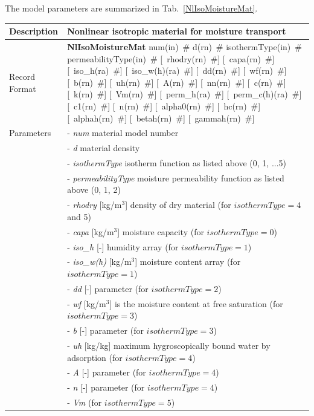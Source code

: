 \documentclass[a4paper]{article}
\newcommand{\descitem}[1]{{\noindent \bf #1}}
\newcommand{\elemparam}[2]{{{#1\tiny (#2)}~\#}}
\newcommand{\optelemparam}[2]{[{~\elemparam{#1}{#2}}]}
\newcommand{\param}[1]{{\it #1}}
\newenvironment{mmt}{\begin{tabular}{|l|p{9cm}|}}{\end{tabular}\\}
\newenvironment{mmt}{\begin{tabular}{|l|l|}}{\end{tabular}\\}
\begin{document}
The model parameters are summarized in Tab.~\ref{NlIsoMoistureMat}.
\begin{table}[!htb]
\begin{mmt}
\hline
Description & Nonlinear isotropic material for moisture transport \\
\hline
Record Format & \descitem{NlIsoMoistureMat} \elemparam{num}{in}
\elemparam{d}{rn} \elemparam{isothermType}{in} \elemparam{permeabilityType}{in}
\optelemparam{rhodry}{rn} \optelemparam{capa}{rn}
\optelemparam{iso\_h}{ra} \optelemparam{iso\_w(h)}{ra}
\optelemparam{dd}{rn} \optelemparam{wf}{rn} \optelemparam{b}{rn}
\optelemparam{uh}{rn} \optelemparam{A}{rn} \optelemparam{nn}{rn}
\optelemparam{c}{rn} \optelemparam{k}{rn} \optelemparam{Vm}{rn}
\optelemparam{perm\_h}{ra} \optelemparam{perm\_c(h)}{ra}
\optelemparam{c1}{rn} \optelemparam{n}{rn} \optelemparam{alpha0}{rn}
\optelemparam{hc}{rn} \optelemparam{alphah}{rn}
\optelemparam{betah}{rn} \optelemparam{gammah}{rn} \\
Parameters &- \param{num} material model number \\
&- \param{d} material density \\
&- \param{isothermType} isotherm function as listed above (0, 1, ...5)
\\
&- \param{permeabilityType} moisture permeability function as listed
above (0, 1, 2) \\
&- \param{rhodry} [kg/m$^3$] density of dry material (for $isothermType=4$ and 5) \\
&- \param{capa} [kg/m$^3$] moisture capacity (for $isothermType=0$) \\
&- \param{iso\_h} [-] humidity array (for $isothermType=1$) \\
&- \param{iso\_w(h)} [kg/m$^3$] moisture content array (for
$isothermType=1$) \\
&- \param{dd} [-] parameter (for $isothermType=2$)\\
&- \param{wf} [kg/m$^3$] is the moisture content at free saturation
(for $isothermType=3$) \\
&- \param{b} [-] parameter (for $isothermType=3$) \\
&- \param{uh} [kg/kg] maximum hygroscopically
bound water by adsorption (for $isothermType=4$) \\
&- \param{A} [-] parameter (for $isothermType=4$) \\
&- \param{n} [-] parameter (for $isothermType=4$) \\
&- \param{Vm} (for $isothermType=5$) \\

\end{mmt}
\end{table}
\end{document}
